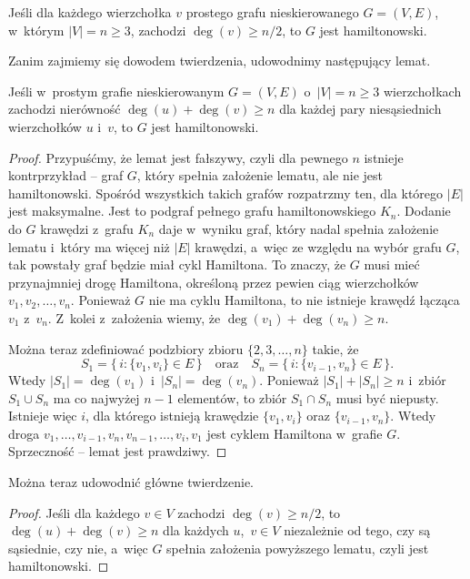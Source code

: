 \subproblem %
\begin{twierdzenie}[Dirac]
	Jeśli dla każdego wierzchołka $v$ prostego grafu nieskierowanego $G=(V,E)$, w~którym $|V|=n\ge3$, zachodzi $\deg(v)\ge n/2$, to $G$ jest hamiltonowski.
\end{twierdzenie}
Zanim zajmiemy się dowodem twierdzenia, udowodnimy następujący lemat.
\begin{lemat}[Ore]
	Jeśli w~prostym grafie nieskierowanym $G=(V,E)$ o~$|V|=n\ge3$ wierzchołkach zachodzi nierówność $\deg(u)+\deg(v)\ge n$ dla każdej pary niesąsiednich wierzchołków $u$ i~$v$, to $G$ jest hamiltonowski.
\end{lemat}
\begin{proof}
Przypuśćmy, że lemat jest fałszywy, czyli dla pewnego $n$ istnieje kontrprzykład -- graf $G$, który spełnia założenie lematu, ale nie jest hamiltonowski. Spośród wszystkich takich grafów rozpatrzmy ten, dla którego $|E|$ jest maksymalne. Jest to podgraf pełnego grafu hamiltonowskiego $K_n$. Dodanie do $G$ krawędzi z~grafu $K_n$ daje w~wyniku graf, który nadal spełnia założenie lematu i~który ma więcej niż $|E|$ krawędzi, a~więc ze względu na wybór grafu $G$, tak powstały graf będzie miał cykl Hamiltona. To znaczy, że $G$ musi mieć przynajmniej drogę Hamiltona, określoną przez pewien ciąg wierzchołków $v_1,v_2,\dots,v_n$. Ponieważ $G$ nie ma cyklu Hamiltona, to nie istnieje krawędź łącząca $v_1$ z~$v_n$. Z~kolei z~założenia wiemy, że $\deg(v_1)+\deg(v_n)\ge n$.

Można teraz zdefiniować podzbiory zbioru $\{2,3,\dots,n\}$ takie, że
\[
	S_1 = \bigl\{\,i:\{v_1,v_i\}\in E\,\bigr\} \quad\text{oraz}\quad S_n = \bigl\{\,i:\{v_{i-1},v_n\}\in E\,\bigr\}.
\]
Wtedy $|S_1|=\deg(v_1)$ i~$|S_n|=\deg(v_n)$. Ponieważ $|S_1|+|S_n|\ge n$ i~zbiór $S_1\cup S_n$ ma co najwyżej $n-1$ elementów, to zbiór $S_1\cap S_n$ musi być niepusty. Istnieje więc $i$, dla którego istnieją krawędzie $\{v_1,v_i\}$ oraz $\{v_{i-1},v_n\}$. Wtedy droga $v_1,\dots,v_{i-1},v_n,v_{n-1},\dots,v_i,v_1$ jest cyklem Hamiltona w~grafie $G$. Sprzeczność -- lemat jest prawdziwy.
\end{proof}

Można teraz udowodnić główne twierdzenie.
\begin{proof}
Jeśli dla każdego $v\in V$ zachodzi $\deg(v)\ge n/2$, to $\deg(u)+\deg(v)\ge n$ dla każdych $u$,~$v\in V$ niezależnie od tego, czy są sąsiednie, czy nie, a~więc $G$ spełnia założenia powyższego lematu, czyli jest hamiltonowski.
\end{proof}


